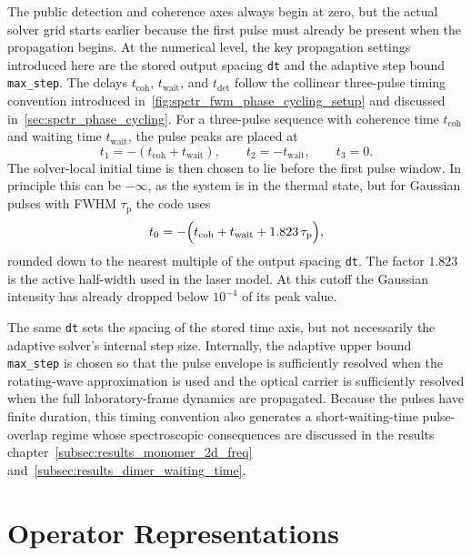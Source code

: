 The public detection and coherence axes always begin at zero, but the actual
solver grid starts earlier because the first pulse must already be present when
the propagation begins. At the numerical level, the key propagation settings
introduced here are the stored output spacing \texttt{dt} and the adaptive step
bound \texttt{max\_step}. The delays $t_{\mathrm{coh}}$,
$t_{\mathrm{wait}}$, and $t_{\mathrm{det}}$ follow the collinear three-pulse
timing convention introduced
in~\autoref{fig:spctr_fwm_phase_cycling_setup} and discussed
in~\autoref{sec:spctr_phase_cycling}. For a three-pulse sequence with coherence
time $t_{\mathrm{coh}}$ and waiting time $t_{\mathrm{wait}}$, the pulse peaks
are placed at
\begin{equation*}
t_1 = -(t_{\mathrm{coh}} + t_{\mathrm{wait}}),
\qquad
t_2 = -t_{\mathrm{wait}},
\qquad
t_3 = 0.
\end{equation*}
The solver-local initial time is then chosen to lie before the first pulse
window. In principle this can be $-\infty$, as the system is in the thermal
state, but for Gaussian pulses with FWHM \(\tau_{\mathrm{p}}\) the code uses
\begin{equation}
t_0 = -\Bigl(t_{\mathrm{coh}} + t_{\mathrm{wait}} + 1.823\,\tau_{\mathrm{p}}\Bigr),
\label{eq:app_solver_initial_time}
\end{equation}
rounded down to the nearest multiple of the output spacing \texttt{dt}. The
factor $1.823$ is the active half-width used in the laser model. At this cutoff
the Gaussian intensity has already dropped below $10^{-4}$ of its peak value.

The same \texttt{dt} sets the spacing of the stored time axis, but not
necessarily the adaptive solver's internal step size. Internally, the adaptive
upper bound \texttt{max\_step} is chosen so that the pulse envelope is
sufficiently resolved when the rotating-wave approximation is used and the
optical carrier is sufficiently resolved when the full laboratory-frame dynamics
are propagated. Because the pulses have finite duration, this timing convention
also generates a short-waiting-time pulse-overlap regime whose spectroscopic
consequences are discussed in the results
chapter~\autoref{subsec:results_monomer_2d_freq}
and~\autoref{subsec:results_dimer_waiting_time}.

\section{Operator Representations}
\label{app:sec:model_systems}

